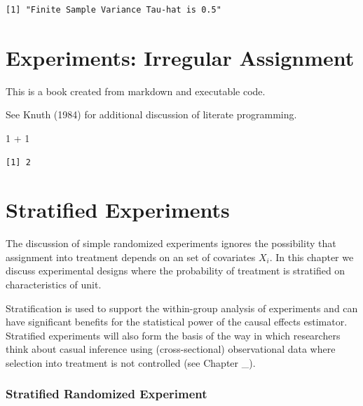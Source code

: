 \documentclass[
  letterpaper,
  DIV=11,
  numbers=noendperiod]{scrreprt}
\newenvironment{Shaded}{\begin{snugshade}}{\end{snugshade}}
\newcommand{\DecValTok}[1]{\textcolor[rgb]{0.68,0.00,0.00}{#1}}
\newcommand{\SpecialCharTok}[1]{\textcolor[rgb]{0.37,0.37,0.37}{#1}}
\theoremstyle{definition}
\theoremstyle{remark}
\begin{document}
\begin{verbatim}
[1] "Finite Sample Variance Tau-hat is 0.5"
\end{verbatim}

\hypertarget{experiments-irregular-assignment}{%
\chapter{Experiments: Irregular
Assignment}\label{experiments-irregular-assignment}}

This is a book created from markdown and executable code.

See Knuth (1984) for additional discussion of literate programming.

\begin{Shaded}
\begin{Highlighting}[]
\DecValTok{1} \SpecialCharTok{+} \DecValTok{1}
\end{Highlighting}
\end{Shaded}

\begin{verbatim}
[1] 2
\end{verbatim}

\hypertarget{stratified-experiments}{%
\chapter{Stratified Experiments}\label{stratified-experiments}}

The discussion of simple randomized experiments ignores the possibility
that assignment into treatment depends on an set of covariates \(X_i\).
In this chapter we discuss experimental designs where the probability of
treatment is stratified on characteristics of unit.

Stratification is used to support the within-group analysis of
experiments and can have significant benefits for the statistical power
of the causal effects estimator. Stratified experiments will also form
the basis of the way in which researchers think about casual inference
using (cross-sectional) observational data where selection into
treatment is not controlled (see Chapter \_).

\hypertarget{stratified-randomized-experiment-1}{%
\subsection{Stratified Randomized
Experiment}\label{stratified-randomized-experiment-1}}
\end{document}
